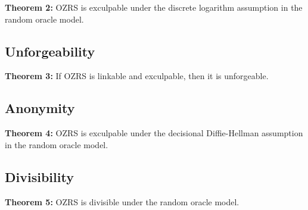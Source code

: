 \documentclass{article}
\begin{document}
{\bf Theorem 2:} OZRS is exculpable under the discrete logarithm assumption in
the random oracle model.

\subsection{Unforgeability}

{\bf Theorem 3:} If OZRS is linkable and exculpable, then it is unforgeable.

\subsection{Anonymity}

{\bf Theorem 4:} OZRS is exculpable under the decisional Diffie-Hellman
assumption in the random oracle model.

\subsection{Divisibility}

{\bf Theorem 5:} OZRS is divisible under the random oracle model.


\end{document}
